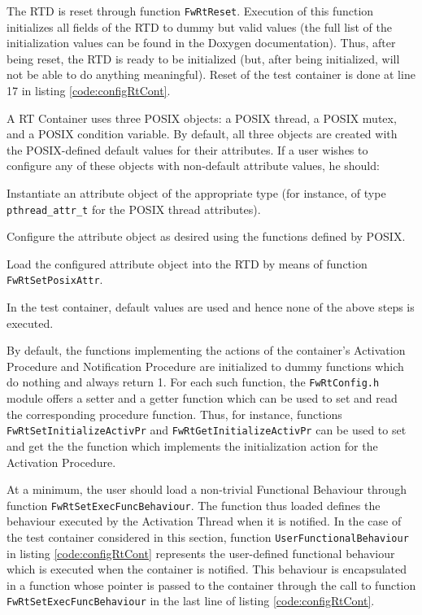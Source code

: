 \documentclass[manual]{../fwprofile}
\begin{document}
The RTD is reset through function \texttt{FwRtReset}. Execution of this function initializes all fields of the RTD to dummy but valid values (the full list of the initialization values can be found in the Doxygen documentation). Thus, after being reset, the RTD is ready to be initialized (but, after being initialized, will not be able to do anything meaningful). Reset of the test container is done at line 17 in listing \ref{code:configRtCont}.

A RT Container uses three POSIX objects: a POSIX thread, a POSIX mutex, and a POSIX condition variable. By default, all three objects are created with the POSIX-defined default values for their attributes. If a user wishes to configure any of these objects with non-default attribute values, he should:

\begin{fw_enumerate}
\item Instantiate an attribute object of the appropriate type (for instance, of type \texttt{pthread\_attr\_t} for the POSIX thread attributes).  
\item Configure the attribute object as desired using the functions defined by POSIX.
\item Load the configured attribute object into the RTD by means of function \texttt{FwRtSetPosixAttr}.
\end{fw_enumerate}

In the test container, default values are used and hence none of the above steps is executed.

By default, the functions implementing the actions of the container's Activation Procedure and Notification Procedure are initialized to dummy functions which do nothing and always return 1. For each such function, the \texttt{FwRtConfig.h} module offers a setter and a getter function which can be used to set and read the corresponding procedure function. Thus, for instance, functions \texttt{FwRtSetInitializeActivPr} and \texttt{FwRtGetInitializeActivPr} can be used to set and get the the function which implements the initialization action for the Activation Procedure.

At a minimum, the user should load a non-trivial Functional Behaviour through function \texttt{FwRtSetExecFuncBehaviour}. The function thus loaded defines the behaviour executed by the Activation Thread when it is notified. In the case of the test container considered in this section, function \texttt{UserFunctionalBehaviour} in listing \ref{code:configRtCont} represents the user-defined functional behaviour which is executed when the container is notified. This behaviour is encapsulated in a function whose pointer is passed to the container through the call to function \texttt{FwRtSetExecFuncBehaviour} in the last line of listing \ref{code:configRtCont}.
\end{document}
